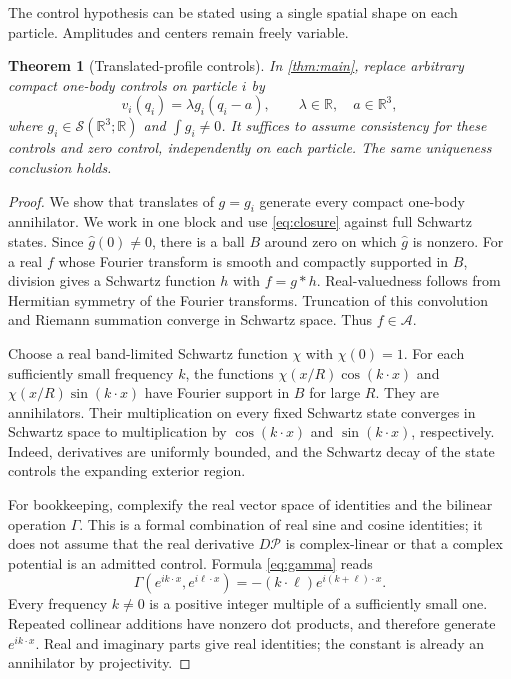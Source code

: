 \documentclass[11pt]{article}
\numberwithin{equation}{section}
\newtheorem{theorem}{Theorem}[section]
\theoremstyle{definition}
\newcommand{\R}{\mathbb R}
\newcommand{\Sch}{\mathcal S}
\newcommand{\Pcal}{\mathcal P}
\newcommand{\Acal}{\mathcal A}
\begin{document}
The control hypothesis can be stated using a single spatial shape on each particle. Amplitudes and centers remain freely variable.

\begin{theorem}[Translated-profile controls]\label{thm:profiles}
In \cref{thm:main}, replace arbitrary compact one-body controls on particle \(i\) by
\[
 v_i(q_i)=\lambda g_i(q_i-a),\qquad
 \lambda\in\R,\quad a\in\R^3,
\]
where \(g_i\in\Sch(\R^3;\R)\) and \(\int g_i\ne0\). It suffices to assume consistency for these controls and zero control, independently on each particle. The same uniqueness conclusion holds.
\end{theorem}

\begin{proof}
We show that translates of \(g=g_i\) generate every compact one-body annihilator. We work in one block and use \eqref{eq:closure} against full Schwartz states. Since \(\widehat g(0)\ne0\), there is a ball \(B\) around zero on which \(\widehat g\) is nonzero. For a real \(f\) whose Fourier transform is smooth and compactly supported in \(B\), division gives a Schwartz function \(h\) with \(f=g*h\). Real-valuedness follows from Hermitian symmetry of the Fourier transforms. Truncation of this convolution and Riemann summation converge in Schwartz space. Thus \(f\in\Acal\).

Choose a real band-limited Schwartz function \(\chi\) with \(\chi(0)=1\). For each sufficiently small frequency \(k\), the functions
\(\chi(x/R)\cos(k\cdot x)\) and \(\chi(x/R)\sin(k\cdot x)\) have Fourier support in \(B\) for large \(R\). They are annihilators. Their multiplication on every fixed Schwartz state converges in Schwartz space to multiplication by \(\cos(k\cdot x)\) and \(\sin(k\cdot x)\), respectively. Indeed, derivatives are uniformly bounded, and the Schwartz decay of the state controls the expanding exterior region.

For bookkeeping, complexify the real vector space of identities and the bilinear operation \(\Gamma\). This is a formal combination of real sine and cosine identities; it does not assume that the real derivative \(D\Pcal\) is complex-linear or that a complex potential is an admitted control. Formula \eqref{eq:gamma} reads
\[
 \Gamma(e^{ik\cdot x},e^{i\ell\cdot x})
       =-(k\cdot\ell)e^{i(k+\ell)\cdot x}.
\]
Every frequency \(k\ne0\) is a positive integer multiple of a sufficiently small one. Repeated collinear additions have nonzero dot products, and therefore generate \(e^{ik\cdot x}\). Real and imaginary parts give real identities; the constant is already an annihilator by projectivity.


\end{proof}
\end{document}
